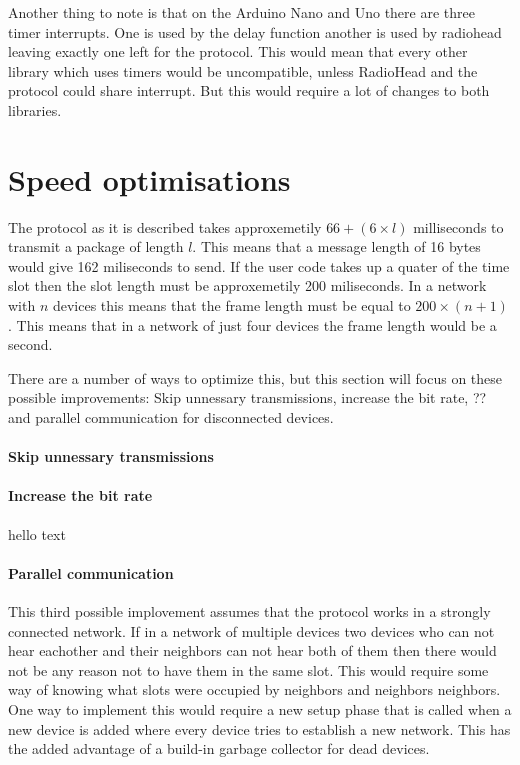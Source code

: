 Another thing to note is that on the Arduino Nano and Uno there are three timer interrupts.
One is used by the delay function another is used by radiohead leaving exactly one left for the protocol.
This would mean that every other library which uses timers would be uncompatible, unless RadioHead and the protocol could share interrupt.
But this would require a lot of changes to both libraries.

\section{Speed optimisations}

The protocol as it is described takes approxemetily $66 + (6 \times l)$ milliseconds to transmit a package of length $l$. 
This means that a message length of 16 bytes would give 162 miliseconds to send.
If the user code takes up a quater of the time slot then the slot length must be approxemetily 200 miliseconds.
In a network with $n$ devices this means that the frame length must be equal to $200 \times (n + 1)$.
This means that in a network of just four devices the frame length would be a second.

There are a number of ways to optimize this, but this section will focus on these possible improvements: Skip unnessary transmissions, increase the bit rate, ?? and parallel communication for disconnected devices.

\paragraph{Skip unnessary transmissions} 

\paragraph{Increase the bit rate} hello text

\paragraph{Parallel communication}
This third possible implovement assumes that the protocol works in a strongly connected network. 
If in a network of multiple devices two devices who can not hear eachother and their neighbors can not hear both of them then there would not be any reason not to have them in the same slot.
This would require some way of knowing what slots were occupied by neighbors and neighbors neighbors.
One way to implement this would require a new setup phase that is called when a new device is added where every device tries to establish a new network.
This has the added advantage of a build-in garbage collector for dead devices.